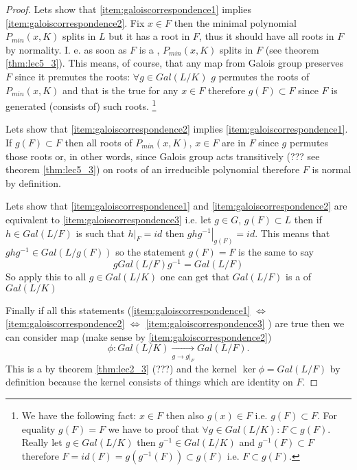 \begin{theorem}
\begin{proof}
    Lets show that \ref{item:galoiscorrespondence1} implies
    \ref{item:galoiscorrespondence2}. Fix $x \in F$ then the minimal
    polynomial $P_{min}\left(x, K\right)$ splits in $L$ but it has a
    root in $F$, thus it should have all roots in $F$ by normality.
    I. e. as soon as $F$ is a ,
    $P_{min}\left(x, K\right)$ splits in $F$ (see theorem
    \ref{thm:lec5_3}). This means, of course, 
    that any map from Galois group preserves $F$ since it premutes the
    roots: $\forall g \in Gal\left(L/K\right)$ $g$ permutes the roots
    of $P_{min}\left(x, K\right)$ and that is the true for any $x \in
    F$ therefore $g\left(F\right) \subset F$ since $F$ is generated
    (consists of) such roots.
    \footnote{
      We have the following fact: $x \in F$ then also $g(x) \in F$
      i.e. $g(F) \subset F$. For equality $g\left(F\right) = F$ we
      have to proof that $\forall g \in Gal\left(L/K\right): F \subset
      g\left(F\right)$. Really let $g \in Gal\left(L/K\right)$ then
      $g^{-1} \in Gal\left(L/K\right)$ and
      $g^{-1}(F) \subset F$ therefore $F = id(F) =
      g\left(g^{-1}(F)\right) \subset 
      g(F)$ i.e. $F \subset g(F)$.  
    }

    Lets show that \ref{item:galoiscorrespondence2} implies
    \ref{item:galoiscorrespondence1}. If $g\left(F\right) \subset F$
    then all roots of $P_{min}\left(x, K\right)$, $x \in F$ are in $F$
    since $g$ permutes those roots or, in other words, since Galois
    group acts transitively (??? see theorem \ref{thm:lec5_3}) on
    roots of an irreducible polynomial therefore $F$ is normal by
    definition.

    Lets show that \ref{item:galoiscorrespondence1} and
    \ref{item:galoiscorrespondence2} are equivalent to
    \ref{item:galoiscorrespondence3} i.e. let $g \in G$,
    $g\left(F\right) \subset L$ then if
    $h \in Gal\left(L/F\right)$ is such that $\left.h\right|_F = id$
    then $\left.g h g^{-1}\right|_{g\left(F\right)} = id$. This means
    that $g h g^{-1} \in Gal\left(L/g\left(F\right)\right)$ so the
    statement $g\left(F\right) = F$ is the same to say
    \[
    g Gal\left(L/F\right) g^{-1} = Gal\left(L/F\right)
    \]
    So apply this to all $g \in Gal\left(L/K\right)$ one can get that
    $Gal\left(L/F\right)$ is a  of
    $Gal\left(L/K\right)$

    Finally if all this statements
    (\ref{item:galoiscorrespondence1}
    $\Longleftrightarrow$
    \ref{item:galoiscorrespondence2}
    $\Longleftrightarrow$
    \ref{item:galoiscorrespondence3}
    ) are true then we can consider map (make sense by
    \ref{item:galoiscorrespondence2}) 
    \[
    \phi: Gal\left(L/K\right)
    \xrightarrow[g \to \left.g\right|_F]{}
    Gal\left(L/F\right).
    \]
    This is a  by theorem \ref{thm:lec2_3}
    (???) and the kernel $\ker \phi = Gal\left(L/F\right)$ by
    definition because the kernel consists of things which are identity on $F$. 
  \end{proof}
  \label{thm:galoiscorrespondence}
\end{theorem}

